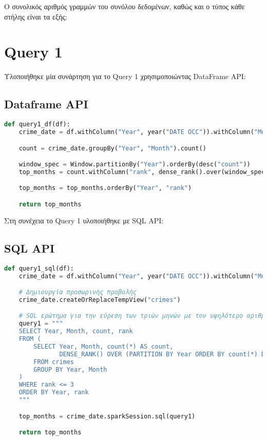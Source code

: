 \documentclass{article}
\begin{document}
Ο συνολικός αριθμός γραμμών του συνόλου δεδομένων, καθώς και ο τύπος κάθε στήλης είναι τα εξής:


\section{Query 1}

Υλοποιήθηκε μία συνάρτηση για το Query 1 χρησιμοποιώντας DataFrame API: 
\subsection*{Dataframe API}

\begin{lstlisting}[language = Python]
    def query1_df(df):
    crime_date = df.withColumn("Year", year("DATE OCC")).withColumn("Month", month("DATE OCC"))

    count = crime_date.groupBy("Year", "Month").count()

    window_spec = Window.partitionBy("Year").orderBy(desc("count"))
    top_months = count.withColumn("rank", dense_rank().over(window_spec)).filter(col("rank") <= 3)

    top_months = top_months.orderBy("Year", "rank")

    return top_months
\end{lstlisting}  

Στη συνέχεια το Query 1 υλοποιήθηκε με SQL API:
\subsection*{SQL API}

\begin{lstlisting}[language = Python]
    def query1_sql(df):
    crime_date = df.withColumn("Year", year("DATE OCC")).withColumn("Month", month("DATE OCC"))

    # Δημιουργία προσωρινής προβολής
    crime_date.createOrReplaceTempView("crimes")

    # SQL ερώτημα για την εύρεση των τριών μηνών με τον υψηλότερο αριθμό εγκλημάτων ανά έτος
    query1 = """
    SELECT Year, Month, count, rank 
    FROM (
        SELECT Year, Month, count(*) AS count, 
               DENSE_RANK() OVER (PARTITION BY Year ORDER BY count(*) DESC) AS rank
        FROM crimes
        GROUP BY Year, Month
    ) 
    WHERE rank <= 3
    ORDER BY Year, rank
    """

    top_months = crime_date.sparkSession.sql(query1)

    return top_months

\end{lstlisting}  
\end{document}
